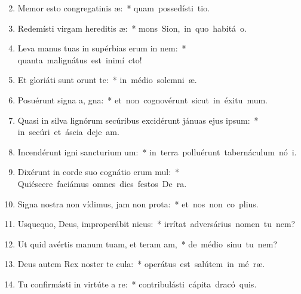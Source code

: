 \begin{flushleft}
\begin{enumerate}[leftmargin=*]
\setcounter{enumi}{1}

\item Memor esto congregatinis æ:~* \mbox{quam possedísti  tio.}
\item Redemísti virgam hereditis æ:~* \mbox{mons Sion, in quo habitá  o.}
\item Leva manus tuas in supérbias erum in nem:~* \mbox{quanta malignátus est inimí  cto!}
\item Et gloriáti sunt  orunt te:~* \mbox{in médio solemni æ.}
\item Posuérunt signa a, gna:~* \mbox{et non cognovérunt sicut in éxitu  mum.}
\item Quasi in silva lignórum secúribus excidérunt jánuas ejus  ipsum:~* \mbox{in secúri et áscia deje am.}
\item Incendérunt igni sancturium um:~* \mbox{in terra polluérunt tabernáculum nó i.}
\item Dixérunt in corde suo cognátio erum mul:~* \mbox{Quiéscere faciámus omnes dies festos De  ra.}
\item Signa nostra non vídimus, jam non  prota:~* \mbox{et nos non co plius.}
\item Usquequo, Deus, improperábit nicus:~* \mbox{irrítat adversárius nomen tu  nem?}
\item Ut quid avértis manum tuam, et teram am,~* \mbox{de médio sinu tu  nem?}
\item Deus autem Rex noster te cula:~* \mbox{operátus est salútem in mé ræ.}
\item Tu confirmásti in virtúte a re:~* \mbox{contribulásti cápita dracó  quis.}

\end{enumerate}
\end{flushleft}
